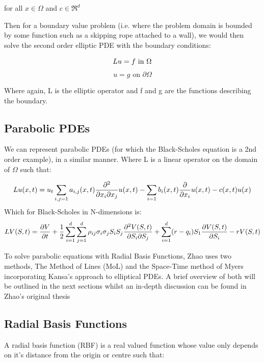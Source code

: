 \documentclass[a4paper]{amsart}
\begin{document}
for all $ x \in \Omega$ and $c \in \Re^{d}$

Then for a boundary value problem (i.e. where the problem domain is bounded by some function such as a skipping rope attached to a wall), we would then solve the second order elliptic PDE with the boundary conditions:

\begin{equation} \label{eq:EPDE1}
Lu = f \mbox{ in } \Omega \\
\end{equation}
\begin{equation} \label{eq:EPDE2}
u = g \mbox{ on } \partial \Omega
\end{equation}

Where again, L is the elliptic operator and f and g are the functions describing the boundary.

\subsection{Parabolic PDEs}
We can represent parabolic PDEs (for which the Black-Scholes equation is a 2nd order example), in a similar manner. Where L is a linear operator on the domain of $\Omega$ such that:

\begin{equation}
Lu(x,t) = u_{t} \sum_{i,j=1} a_{i,j}(x,t) \pdv{}{x_i}{x_j} u(x,t) - \sum_{i=1} b_{i}(x,t) \pdv{}{x_i} u(x,t) - c(x,t) u(x)
\label{PPDE}
\end{equation}
Which for Black-Scholes in N-dimensions is:
\begin{equation}
LV(S,t) = \pdv{V}{t} + \frac{1}{2} \sum^{d}_{i=1} \sum^{d}_{j=1} \rho_{ij} \sigma_{i} \sigma_{j} S_{i} S_{j} \pdv{V(S,t)}{S_{i}}{S_{j}}+ \sum^{d}_{i=1}(r-q_{i})S_{1} \pdv{V(S,t)}{S_{i}} - rV(S,t)
\end{equation}

To solve parabolic equations with Radial Basis Functions, Zhao uses two methods, The Method of Lines (MoL) and the Space-Time method of Myers incorporating Kansa's approach to elliptical PDEs. A brief overview of both will be outlined in the next sections whilst an in-depth discussion can be found in Zhao's original thesis \cite{mski0}

\subsection{Radial Basis Functions}\label{sec:RBF}

A radial basis function (RBF) is a real valued function whose value only depends on it's distance from the origin or centre such that:
\end{document}
